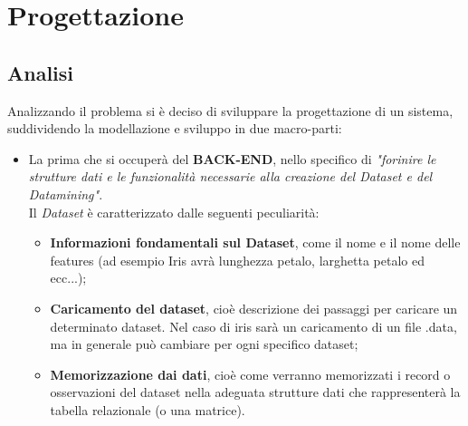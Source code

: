 \documentclass[a4paper, oneside]{book}
\begin{document}
\pagestyle{myheadings} 
\chapter*{Progettazione}
\pagestyle{myheadings} 

\large



\section*{Analisi}
Analizzando il problema si è deciso di sviluppare la progettazione di
un sistema, suddividendo la modellazione e sviluppo in due macro-parti:
\begin{itemize}
\item La prima che si occuperà del \textbf{BACK-END}, nello specifico di \textit{"forinire le strutture dati e le funzionalità necessarie alla creazione del Dataset e del Datamining"}. \\
Il \textit{Dataset} è caratterizzato dalle seguenti peculiarità:
     \begin{itemize}
        \item{\textbf{Informazioni fondamentali sul Dataset}, come il nome e il nome delle features (ad esempio Iris avrà lunghezza petalo, larghetta petalo ed ecc...);}
        \item{\textbf{Caricamento del dataset}, cioè descrizione dei passaggi per caricare un determinato dataset. Nel caso di iris sarà un caricamento di un file .data, ma in generale può cambiare per ogni specifico dataset;}
        \item{\textbf{Memorizzazione dai dati}, cioè come verranno memorizzati i record o osservazioni del dataset nella adeguata strutture dati che rappresenterà la tabella relazionale (o una matrice).}
      \end{itemize}


\end{itemize}
\end{document}

